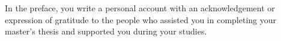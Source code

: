In the preface, you write a personal account with an acknowledgement or expression of gratitude to the people who assisted you in completing your master's thesis and supported you during your studies.